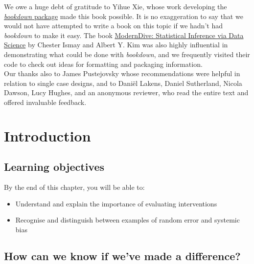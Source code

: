 \documentclass{krantz}
\begin{document}
We owe a huge debt of gratitude to Yihue Xie, whose work developing the \href{https://bookdown.org/}{\emph{bookdown} package} made this book possible. It is no exaggeration to say that we would not have attempted to write a book on this topic if we hadn't had \emph{bookdown} to make it easy. The book \href{https://moderndive.com/}{ModernDive: Statistical Inference via Data Science} by Chester Ismay and Albert Y. Kim was also highly influential in demonstrating what could be done with \emph{bookdown}, and we frequently visited their code to check out ideas for formatting and packaging information.\\
Our thanks also to James Pustejovsky whose recommendations were helpful in relation to single case designs, and to Daniël Lakens, Daniel Sutherland, Nicola Dawson, Lucy Hughes, and an anonymous reviewer, who read the entire text and offered invaluable feedback.



\listoffigures
\listoftables

\mainmatter

\hypertarget{intro}{%
\chapter{Introduction}\label{intro}}

\hypertarget{learning-objectives}{%
\section{Learning objectives}\label{learning-objectives}}

By the end of this chapter, you will be able to:

\begin{itemize}
\item
  Understand and explain the importance of evaluating interventions
\item
  Recognise and distinguish between examples of random error and systemic bias
\end{itemize}

\hypertarget{how-can-we-know-if-weve-made-a-difference}{%
\section{How can we know if we've made a difference?}\label{how-can-we-know-if-weve-made-a-difference}}
\end{document}
